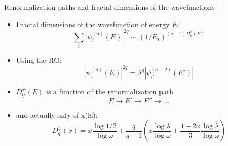 \documentclass[xcolor=x11names,compress,professionalfonts]{beamer}
\renewcommand{\(}{\begin{columns}}
\renewcommand{\)}{\end{columns}}
\newcommand{\<}[1]{\begin{column}{#1}}
\renewcommand{\>}{\end{column}}
\newcommand{\lb}{\ensuremath{\overline{\lambda}}}
\begin{document}
\begin{frame}{Renormalization paths and fractal dimensions of the wavefunctions}
\begin{itemize}
	\item Fractal dimensions of the wavefunction of energy $E$:
	\[ \sum_i |\psi_i^{(n)}(E)|^{2q} \sim (1/F_n)^{(q-1)D_q^\psi(E)}  \]
	\item Using the RG:
		\[ |\psi_i^{(n)}(E)|^{2q} = \lambda^q |\psi_{i'}^{(n-2)}(E')| \]
	\item $D_q^\psi(E)$ is a function of the renormalization path
	\[ E \rightarrow E' \rightarrow E'' \rightarrow ... \]
	\item and actually only of x(E):
	\[ D_q^\psi(x) = x \frac{\log 1/2}{\log \omega} + \frac{q}{q-1} \left( x \frac{\log \lambda}{\log \omega} + \frac{1-2x}{3}\frac{\log \lb}{\log \omega} \right) \]
\end{itemize}
\end{frame}
\end{document}

